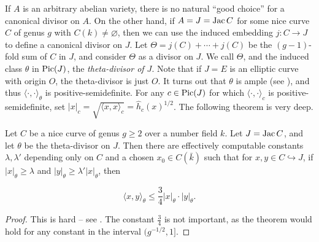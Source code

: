 \documentclass{article}
\begin{document}
If $A$ is an arbitrary abelian variety, there is no natural ``good choice'' for 
a canonical divisor on $A$. On the other hand, if $A=J=\operatorname{Jac} C$ for some nice 
curve $C$ of genus $g$ with $C(k)\ne\varnothing$, then we can use the induced 
embedding $j:C\to J$ to define a canonical divisor on $J$. Let 
$\Theta=j(C)+\cdots + j(C)$ be the $(g-1)$-fold sum of $C$ in $J$, and consider 
$\Theta$ as a divisor on $J$. We call $\Theta$, and the induced class $\theta$ 
in $\operatorname{Pic}(J)$, the \emph{theta-divisor of $J$}. Note that if $J=E$ is an elliptic 
curve with origin $O$, the theta-divisor is just $O$.  It turns out that 
$\theta$ is ample (see \cite[8.10.22]{bg06}), and thus 
$\langle\cdot,\cdot\rangle_\theta$ is positive-semidefinite. For any 
$c\in \operatorname{Pic}(J)$ for which $\langle\cdot,\cdot\rangle_c$ is 
positive-semidefinite, set 
$|x|_c=\sqrt{\langle x,x\rangle_c} = \widehat h_c(x)^{1/2}$. The following 
theorem is very deep.

\begin{theorem}
Let $C$ be a nice curve of genus $g\geqslant 2$ over a number field $k$. Let 
$J=\operatorname{Jac} C$, and let $\theta$ be the theta-divisor on $J$. Then there are 
effectively computable constants $\lambda,\lambda'$ depending only on $C$ and 
a chosen $x_0\in C(\bar k)$ such that for $x,y\in C\hookrightarrow J$, if 
$|x|_\theta\geqslant \lambda$ and 
$|y|_\theta\geqslant \lambda'|x|_\theta$, then 

\[
  \langle x,y\rangle_\theta \leqslant \frac 3 4 |x|_\theta\cdot |y|_\theta\text{.}
\]
\end{theorem}
\begin{proof}
This is hard -- see \cite[11.9.1]{bg06}. The constant $\frac 3 4$ is not 
important, as the theorem would hold for any constant in the interval 
$(g^{-1/2},1]$. 
\end{proof}










\end{document}
